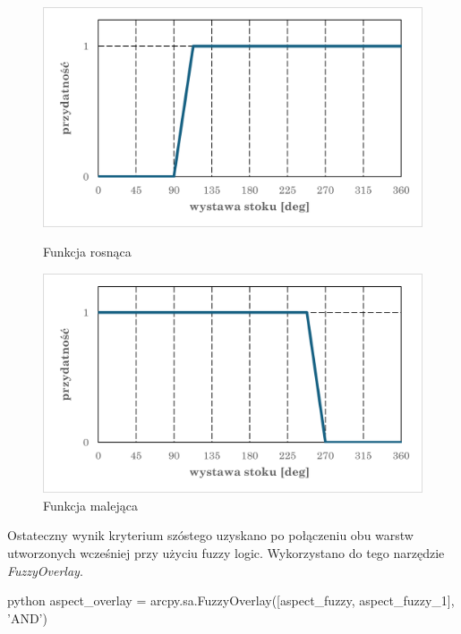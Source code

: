 \documentclass{article}
\begin{document}
\begin{figure}[H]
    \centering
    \begin{minipage}{0.48\textwidth}
        \centering
        \includegraphics[width=\linewidth]{img/kryterium6-wykres-pierwszy.png}
        \caption{Funkcja rosnąca}
    \end{minipage}
    \begin{minipage}{0.48\textwidth}
        \centering
        \includegraphics[width=\linewidth]{img/kryterium6-wykres-drugi.png}
        \caption{Funkcja malejąca}
    \end{minipage}
\end{figure}
\newpage

Ostateczny wynik kryterium szóstego uzyskano po połączeniu obu warstw utworzonych wcześniej przy użyciu fuzzy logic. Wykorzystano do tego narzędzie \textit{FuzzyOverlay}.
\vspace{5pt}

\begin{mintedbox}{python}
aspect_overlay = arcpy.sa.FuzzyOverlay([aspect_fuzzy, aspect_fuzzy_1], 'AND')
\end{mintedbox}
\vspace{5pt}
\end{document}
